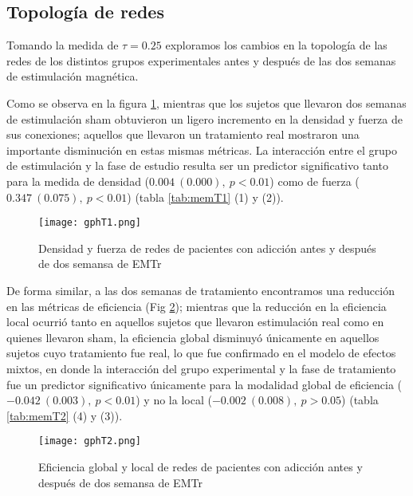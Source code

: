 \subsection{Topología de redes}
Tomando la medida de $\tau = 0.25$ exploramos los cambios en la topología de las redes de los distintos grupos experimentales antes y después de las dos semanas de estimulación magnética.\par
Como se observa en la figura \ref{fig:gpT1}, mientras que los sujetos que llevaron dos semanas de estimulación sham obtuvieron un ligero incremento en la densidad y fuerza de sus conexiones; aquellos que llevaron un tratamiento real mostraron una importante disminución en estas mismas métricas. La interacción entre el grupo de estimulación y la fase de estudio resulta ser un predictor significativo tanto para la medida de densidad ($0.004\ (0.000),\ p<0.01$) como de fuerza ($0.347\ (0.075),\ p<0.01$) (tabla \ref{tab:memT1} (1) y (2)).\par

\begin{figure}[!tb]
    \centering
    \texttt{[image: gphT1.png]}
    \caption{Densidad y fuerza de redes de pacientes con adicción antes y después de dos semansa de EMTr}
    \label{fig:gpT1}
\end{figure}

De forma similar, a las dos semanas de tratamiento encontramos una reducción en las métricas de eficiencia (Fig \ref{fig:gpT2}); mientras que la reducción en la eficiencia local ocurrió tanto en aquellos sujetos que llevaron estimulación real como en quienes llevaron sham, la eficiencia global disminuyó únicamente en aquellos sujetos cuyo tratamiento fue real, lo que fue confirmado en el modelo de efectos mixtos, en donde la interacción del grupo experimental y la fase de tratamiento fue un predictor significativo únicamente para la modalidad global de eficiencia ($-0.042\ (0.003),\ p<0.01$) y no la local ($-0.002\ (0.008),\ p>0.05$) (tabla \ref{tab:memT2} (4) y (3)).\par

\begin{figure}[!htb]
    \centering
    \texttt{[image: gphT2.png]}
    \caption{Eficiencia global y local de redes de pacientes con adicción antes y después de dos semansa de EMTr}
    \label{fig:gpT2}
\end{figure}

